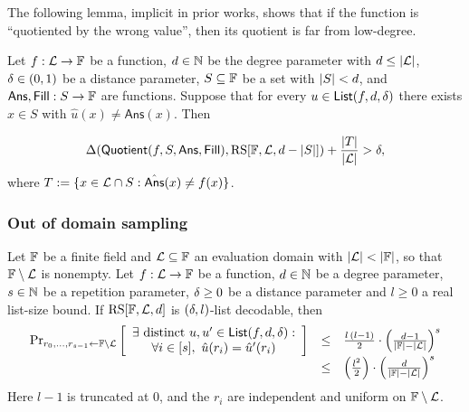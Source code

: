 The following lemma, implicit in prior works, shows that if the function is ``quotiented by the wrong value'', then its quotient is far from low-degree.

\begin{lemma}\label{lemma:quotienting}
\leanok
{}
    Let $f:\mathcal{L}\rightarrow\mathbb{F}$ be a function, $d\in\mathbb{N}$ be the degree parameter with $d\le|\mathcal{L}|$, $\delta\in(0,1)$
    be a distance parameter, $S\subseteq\mathbb{F}$ be a set with $|S|<d$, and $\mathsf{Ans},\mathsf{Fill}:S\rightarrow\mathbb{F}$ are functions. Suppose that for every $u\in\mathsf{List}(f,d,\delta)$ there exists $x\in S$ with $\hat{u}(x)\neq\mathsf{Ans}(x)$. Then

    \[
            \Delta(\mathsf{Quotient}(f,S,\mathsf{Ans},\mathsf{Fill}),\mathrm{RS}[\mathbb{F},\mathcal{L},d-|S|])+\frac{|T|}{|\mathcal{L}|}>\delta,
    \]
    where $T:=\{x\in\mathcal{L}\cap S: \hat{\mathsf{Ans}}(x)\neq f(x)\}$.
\end{lemma}

\subsubsection{Out of domain sampling}\label{sec:out_of_domain_smpl}
\begin{lemma}\label{lemma:out_of_domain_smpl}
\leanok
{}
    Let $\mathbb{F}$ be a finite field and $\mathcal{L}\subseteq\mathbb{F}$ an evaluation domain with $|\evaldomain|<|\field|$, so that $\mathbb{F}\setminus\mathcal{L}$ is nonempty. Let $f:\mathcal{L}\rightarrow\mathbb{F}$ be a function, $d\in\mathbb{N}$ be a degree parameter, $s\in\mathbb{N}$ be a repetition parameter, $\delta\ge0$ be a distance parameter and $l\ge0$ a real list-size bound. If $\mathrm{RS}[\mathbb{F},\mathcal{L},d]$ is $(\delta,l)$-list decodable, then
        \[
        \begin{array}{rcl}
        \Pr_{\substack{r_0, \ldots, r_{s-1} \gets \mathbb{F} \setminus \mathcal{L}}}
        \left[
        \begin{array}{c}
            \exists \text{ distinct } u, u' \in \mathsf{List}(f, d, \delta): \\
            \forall i \in [s],\ \hat{u}(r_i) = \hat{u}'(r_i)
        \end{array}
        \right]
        & \leq & \frac{l\,(l-1)}{2} \cdot \left( \frac{d - 1}{|\mathbb{F}| - |\mathcal{L}|} \right)^s \\
        & \leq & \left( \frac{l^2}{2} \right) \cdot \left( \frac{d}{|\mathbb{F}| - |\mathcal{L}|} \right)^s
        \end{array}
        \]
    Here $l-1$ is truncated at $0$, and the $r_i$ are independent and uniform on
    $\mathbb{F}\setminus\mathcal{L}$.
\end{lemma}

